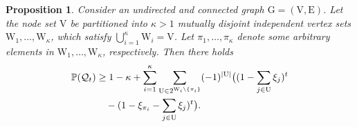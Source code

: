 \documentclass[a4paper, 11pt]{article}
\newcommand{\1}{\mathbf{1}}
\newcommand{\mG}{\mathrm{G}}
\newcommand{\mV}{\mathrm{V}}
\newcommand{\mE}{\mathrm{E}}
\newcommand{\mW}{\mathrm{W}}
\newcommand{\mU}{\mathrm{U}}
\newtheorem{proposition}{Proposition}
\begin{document}
\begin{proposition}\label{prop:tighter_bound}
	Consider an undirected and connected graph $\mG=(\mV,\mE)$. Let the node set $\mV$ be partitioned into $\kappa > 1$ mutually disjoint independent vertex sets $\mW_1,\dots,\mW_\kappa$, which satisfy $\bigcup\limits_{i=1}^\kappa \mW_i=\mV$. Let $\pi_1,\dots,\pi_\kappa$ denote some arbitrary elements in $\mW_1,\dots,\mW_\kappa$, respectively. Then there holds
	\begin{equation}\notag
	\begin{aligned}
	\mathbb{P}(\mathcal{Q}_t)&\ge 1-\kappa+\sum\limits_{i=1}^\kappa\sum\limits_{\mU\in 2^{\mW_i\setminus\{\pi_i\}}}(-1)^{\left|\mU\right|}\big((1-\sum\limits_{j\in\mU}\xi_j)^t\notag\\
	&\quad
	-(1-\xi_{\pi_i}-\sum\limits_{j\in\mU}\xi_j)^t\big).
	\end{aligned}
	\end{equation}
\end{proposition}
\end{document}
